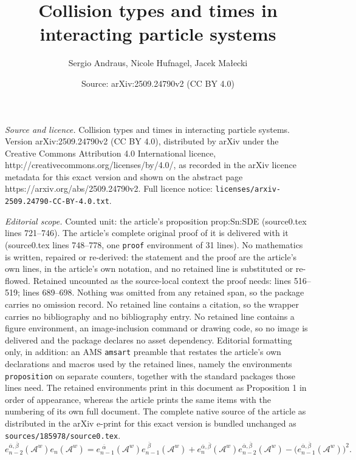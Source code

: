 \documentclass[10pt,a4paper]{amsart}
\title{Collision types and times in interacting particle systems}
\author{Sergio Andraus, Nicole Hufnagel, Jacek Ma{\l}ecki}
\date{Source: arXiv:2509.24790v2 (CC BY 4.0)}
\newcommand{\Aa}{\mathcal{A}^{w}}
\newcommand{\eA}[1]{e_{#1}(\Aa)}
\newcommand{\eaA}[1]{e_{#1}^{\shift\overline{\alpha}}(\Aa)}
\newcommand{\eabA}[1]{e_{#1}^{\overline{\alpha}, \overline{\beta}}(\Aa)}
\newcommand{\ebA}[1]{e_{#1}^{\shift\overline{\beta}}(\Aa)}
\newcommand{\shift}{\,\,}
\begin{document}
\maketitle

\noindent\emph{Source and licence.} Collision types and times in interacting particle systems. Version arXiv:2509.24790v2 (CC BY 4.0), distributed by arXiv under the Creative Commons Attribution 4.0 International licence, http://creativecommons.org/licenses/by/4.0/, as recorded in the arXiv licence metadata for this exact version and shown on the abstract page https://arxiv.org/abs/2509.24790v2. Full licence notice: \texttt{licenses/arxiv-2509.24790-CC-BY-4.0.txt}.\par\smallskip

\noindent\textit{Editorial scope.} Counted unit: the article's proposition prop:Sn:SDE (source0.tex lines 721--746). The article's complete original proof of it is delivered with it (source0.tex lines 748--778, one \texttt{proof} environment of 31 lines). No mathematics is written, repaired or re-derived: the statement and the proof are the article's own lines, in the article's own notation, and no retained line is substituted or re-flowed.  Retained uncounted as the source-local context the proof needs: lines 516--519; lines 689--698.  Nothing was omitted from any retained span, so the package carries no omission record.  No retained line contains a citation, so the wrapper carries no bibliography and no bibliography entry.  No retained line contains a figure environment, an image-inclusion command or drawing code, so no image is delivered and the package declares no asset dependency.  Editorial formatting only, in addition: an AMS \texttt{amsart} preamble that restates the article's own declarations and macros used by the retained lines, namely the environments \texttt{proposition} on separate counters, together with the standard packages those lines need.  The retained environments print in this document as Proposition 1 in order of appearance, whereas the article prints the same items with the numbering of its own full document.  The complete native source of the article as distributed in the arXiv e-print for this exact version is bundled unchanged as \texttt{sources/185978/source0.tex}.
\begin{equation}
	\label{eq:e:form2}
	\eabA{n-2}\eA{n} = \eaA{n-1}\ebA{n-1}+\eabA{n}\eabA{n-2}-\big(\eabA{n-1}\big)^2.
\end{equation}
\end{document}
